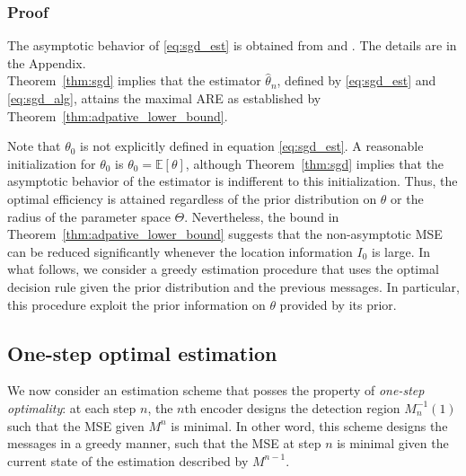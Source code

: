 \documentclass[letterpaper, conference, 11pt]{IEEEtran}      %
\begin{document}
\subsubsection*{Proof}
The asymptotic behavior of \eqref{eq:sgd_est} is obtained from \cite[Thm. 4]{polyak1992acceleration} and \cite[Thm. 2]{polyak1990new}. The details are in the Appendix.\\

Theorem~\ref{thm:sgd} implies that the estimator $\hat{\theta}_n$, defined by \eqref{eq:sgd_est} and \eqref{eq:sgd_alg}, attains the maximal ARE as established by Theorem~\ref{thm:adpative_lower_bound}.
\par
Note that $\theta_0$ is not explicitly defined 
in equation \eqref{eq:sgd_est}. A reasonable initialization for $\theta_0$ is $\theta_0 = \mathbb E [\theta]$, although Theorem~\ref{thm:sgd} implies that the asymptotic behavior of the estimator is indifferent to this initialization. Thus, the optimal efficiency is attained regardless of the prior distribution on $\theta$ or the radius of the parameter space $\Theta$. Nevertheless, the bound in Theorem~\ref{thm:adpative_lower_bound} suggests that the non-asymptotic MSE can be reduced significantly whenever the location information $I_0$ is large. In what follows, we consider a greedy estimation procedure that uses the optimal decision rule given the prior distribution and the previous messages. In particular, this procedure exploit the prior information on $\theta$ provided by its prior. 

\subsection{One-step optimal estimation}
We now consider an estimation scheme that posses the property of \emph{one-step optimality}: at each step $n$, the $n$th encoder designs the detection region $M_n^{-1}(1)$ such that the MSE given $M^n$ is minimal. In other word, this scheme designs the messages in a greedy manner, such that the MSE at step $n$ is minimal given the current state of the estimation described by $M^{n-1}$. \\
\end{document}
